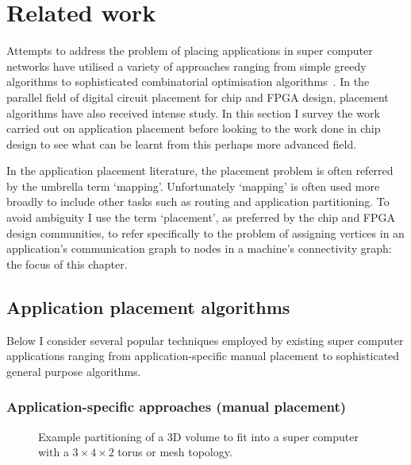 	\section{Related work}
		
		Attempts to address the problem of placing applications in super computer
		networks have utilised a variety of approaches ranging from simple greedy
		algorithms to sophisticated combinatorial optimisation
		algorithms~\cite{jeannot14}. In the parallel field of digital circuit
		placement for chip and FPGA design, placement algorithms have also received
		intense study.  In this section I survey the work carried out on
		application placement before looking to the work done in chip design to see
		what can be learnt from this perhaps more advanced field.
		
		In the application placement literature, the placement problem is often
		referred by the umbrella term `mapping'. Unfortunately `mapping' is often
		used more broadly to include other tasks such as routing and application
		partitioning. To avoid ambiguity I use the term `placement', as preferred
		by the chip and FPGA design communities, to refer specifically to the
		problem of assigning vertices in an application's communication graph to
		nodes in a machine's connectivity graph: the focus of this chapter.
		
		\subsection{Application placement algorithms}
			
			Below I consider several popular techniques employed by existing super
			computer applications ranging from application-specific manual placement
			to sophisticated general purpose algorithms.
			
			\subsubsection{Application-specific approaches (manual placement)}
				
				\begin{figure}
					\center
					
					\caption[Partitioning of a 3D volumn for a $3\times4\times2$ torus.]%
					{Example partitioning of a 3D volume to fit into a super
					computer with a $3\times4\times2$ torus or mesh topology.}
					\label{fig:fem-partitioning}
				\end{figure}
				
